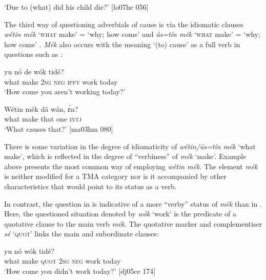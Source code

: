 \glt ‘Due to (what) did his child die?’ [lo07he 056]
\z

The third way of questioning adverbials of cause is via the idiomatic clauses \textit{wétin mék} ‘\textsc{what} make’ = ‘why; how come’ and \textit{ús=tín mék} \textsc{‘what} make’ \textsc{=} \textsc{‘}why; how come’ . \textit{Mék} also occurs with the meaning ‘(to) cause’ as a full verb in questions such as :


\ea%
    \label{ex:key:646}
    \gll {}      yu  nó  de  wók    tidé?\\
what  make  \textsc{2sg}  \textsc{neg}  \textsc{ipfv}  work  today\\

\glt ‘How come you aren’t working today?’\textstylePichiglossZchn{ [ro05ee 016]}
\z


\ea%
    \label{ex:key:647}
    \gll Wétin  mék    dá  wán,  ɛ́n?\\
what  make  that  one    \textsc{intj}\\

\glt ‘What causes that?’ [ma03hm 080]
\z

There is some variation in the degree of idiomaticity of \textit{wétin/ús=tín mék} ‘what make’, which is reflected in the degree of “verbiness” of \textit{mék} ‘make’. Example  above presents the most common way of employing \textit{wétin mék}. The element \textit{mék} is neither modified for a TMA category nor is it accompanied by other characteristics that would point to its status as a verb. 


In contrast, the question in  is indicative of a more “verby” status of \textit{mék} than in . Here, the questioned situation denoted by \textit{wók} ‘work’ is the predicate of a quotative clause to the main verb \textit{mék}. The quotative marker and complementiser \textit{sé} ‘\textsc{quot}’ links the main and subordinate clauses: 



\ea%
    \label{ex:key:648}
    \gll {}          yu  nó  wók    tidé?\\
what  make  \textsc{quot}    \textsc{2sg}  \textsc{neg}  work  today\\

\glt ‘How come you didn’t work today?’ [dj05ce 174]
\z

